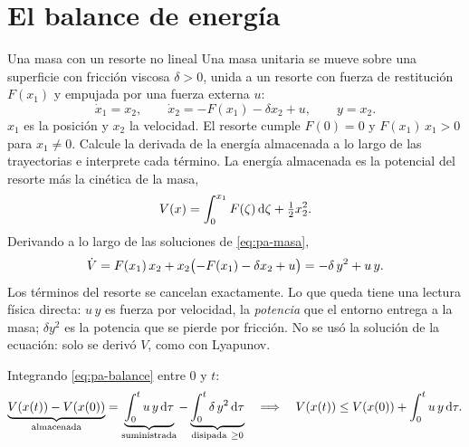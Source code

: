 \section{El balance de energía}
\label{sec:pa-balance}

\begin{ejemplo}[label=ej:pa-masa]{Una masa con un resorte no lineal}
Una masa unitaria se mueve sobre una superficie con fricción viscosa $\delta>0$, unida a un resorte con fuerza de restitución $F(x_1)$ y empujada por una fuerza externa $u$:
\begin{equation}
  \dot x_1=x_2,\qquad \dot x_2=-F(x_1)-\delta x_2+u,\qquad y=x_2 .
  \label{eq:pa-masa}
\end{equation}
$x_1$ es la posición y $x_2$ la velocidad. El resorte cumple $F(0)=0$ y $F(x_1)\,x_1>0$ para $x_1\neq0$. Calcule la derivada de la energía almacenada a lo largo de las trayectorias e interprete cada término.
\solucion La energía almacenada es la potencial del resorte más la cinética de la masa,
\begin{equation}
  V(x)=\int_0^{x_1}F(\zeta)\,\mathrm{d}\zeta+\tfrac12x_2^2 .
  \label{eq:pa-Vmasa}
\end{equation}
Derivando a lo largo de las soluciones de \eqref{eq:pa-masa},
\begin{equation}
  \dot V=F(x_1)\,x_2+x_2\bigl(-F(x_1)-\delta x_2+u\bigr)=-\delta\,y^2+u\,y .
  \label{eq:pa-balance}
\end{equation}
Los términos del resorte se cancelan exactamente. Lo que queda tiene una lectura física directa: $u\,y$ es fuerza por velocidad, la \emph{potencia} que el entorno entrega a la masa; $\delta y^2$ es la potencia que se pierde por fricción. No se usó la solución de la ecuación: solo se derivó $V$, como con Lyapunov.
\end{ejemplo}

Integrando \eqref{eq:pa-balance} entre $0$ y $t$:
\begin{equation}
  \underbrace{V(x(t))-V(x(0))}_{\text{almacenada}}
  =\underbrace{\int_0^t u\,y\,\mathrm{d}\tau}_{\text{suministrada}}
  -\underbrace{\int_0^t\delta\,y^2\,\mathrm{d}\tau}_{\text{disipada}\ \ge 0}
  \quad\Longrightarrow\quad
  V(x(t))\le V(x(0))+\int_0^t u\,y\,\mathrm{d}\tau .
  \label{eq:pa-balanceint}
\end{equation}

